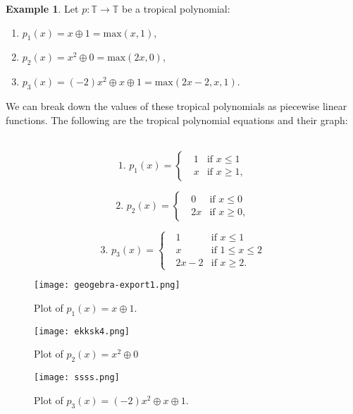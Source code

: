 \documentclass[]{article}
\theoremstyle{definition}
\numberwithin{equation}{section}
\newtheorem{examp}[thm]{Example}
\renewcommand{\.}{\,.}
\begin{document}
\begin{examp} Let $p:\mathbb{T}\to\mathbb{T} $ be a tropical polynomial: 
\begin{enumerate}[noitemsep,topsep=-6pt]
\item \vspace{0.75mm}
		$ p_1(x)=x \oplus 1 =\textrm{max}(x, 1),$ \vspace{2mm}
		\item $ p_2(x)=x^2 \oplus 0 =\textrm{max}(2x, 0), $\vspace{2mm}
		\item $ p_3(x)=(-2)x^2\oplus x \oplus 1 = \textrm{max}(2x-2,x,1).  $
\end{enumerate}
We can break down the values of these tropical polynomials as piecewise linear functions. The following are the tropical polynomial equations and their graph: \\ \\
		\noindent\begin{minipage}{.5\linewidth}
		\[\textrm{1. } p_1(x) = \begin{cases} 
			\textrm{ }1 & \textrm{if }x\leq 1 \\
			\textrm{ }x & \textrm{if }x\geq 1,
		\end{cases}
		\]
	\end{minipage}%
	\begin{minipage}{.5\linewidth}
		\[\textrm{2. } p_2(x) = \begin{cases} 
			\textrm{ }0 & \textrm{if }x\leq 0 \\
			\textrm{ }2x & \textrm{if }x\geq 0, 
		\end{cases}
		\]
	\end{minipage}
	\[\textrm{3. } p_3(x) = \begin{cases} 
		\textrm{ }1 & \textrm{if }x\leq 1 \\
		\textrm{ }x & \textrm{if }1 \leq x\leq 2 \\
		\textrm{ }2x-2 & \textrm{if }x\geq 2. 
	\end{cases}
	\]

\end{examp}
\vspace{10mm}
\begin{figure}[H]
	\centering
	\texttt{[image: geogebra-export1.png]}
	\caption{Plot of $p_1(x)=x\oplus 1$.}
	\label{fig:1} 
\end{figure}
\vspace{8mm}
\begin{figure}[H]
	\centering
	\texttt{[image: ekksk4.png]}
	\caption{Plot of $p_2(x)=x^2\oplus 0$}
	\label{fig:Figure 2} 
\end{figure}	
\begin{figure}[H]
	\centering
	\texttt{[image: ssss.png]}
	\caption{Plot of $p_3(x)=(-2)x^2\oplus x \oplus 1$.}
	\label{fig:3} 
\end{figure}
\end{document}
